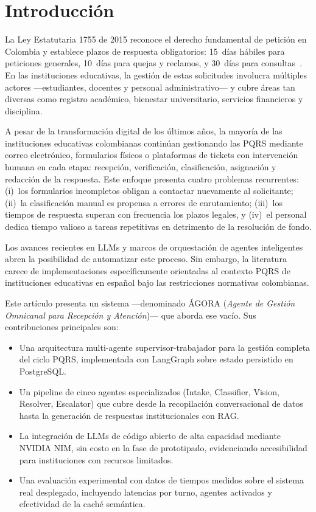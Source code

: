 \documentclass[runningheads]{llncs}
\begin{document}
\section{Introducción}
\label{sec:intro}

La Ley Estatutaria 1755 de 2015 reconoce el derecho fundamental de petición en Colombia y establece plazos de respuesta obligatorios: 15~días hábiles para peticiones generales, 10~días para quejas y reclamos, y 30~días para consultas~\cite{ley1755}. En las instituciones educativas, la gestión de estas solicitudes involucra múltiples actores —estudiantes, docentes y personal administrativo— y cubre áreas tan diversas como registro académico, bienestar universitario, servicios financieros y disciplina.

A pesar de la transformación digital de los últimos años, la mayoría de las instituciones educativas colombianas continúan gestionando las PQRS mediante correo electrónico, formularios físicos o plataformas de tickets con intervención humana en cada etapa: recepción, verificación, clasificación, asignación y redacción de la respuesta. Este enfoque presenta cuatro problemas recurrentes: (i)~los formularios incompletos obligan a contactar nuevamente al solicitante; (ii)~la clasificación manual es propensa a errores de enrutamiento; (iii)~los tiempos de respuesta superan con frecuencia los plazos legales, y (iv)~el personal dedica tiempo valioso a tareas repetitivas en detrimento de la resolución de fondo.

Los avances recientes en LLMs y marcos de orquestación de agentes inteligentes ~\cite{brown2020,park2023,wang2024} abren la posibilidad de automatizar este proceso. Sin embargo, la literatura carece de implementaciones específicamente orientadas al contexto PQRS de instituciones educativas en español bajo las restricciones normativas colombianas.

Este artículo presenta un sistema —denominado ÁGORA (\textit{Agente de Gestión Omnicanal para Recepción y Atención})— que aborda ese vacío. Sus contribuciones principales son:
\begin{itemize}[noitemsep]
  \item Una arquitectura multi-agente supervisor-trabajador para la gestión completa del ciclo PQRS, implementada con LangGraph sobre estado persistido en PostgreSQL.
  \item Un pipeline de cinco agentes especializados (Intake, Classifier, Vision, Resolver, Escalator) que cubre desde la recopilación conversacional de datos hasta la generación de respuestas institucionales con RAG.
  \item La integración de LLMs de código abierto de alta capacidad mediante NVIDIA NIM, sin costo en la fase de prototipado, evidenciando accesibilidad para instituciones con recursos limitados.
  \item Una evaluación experimental con datos de tiempos medidos sobre el sistema real desplegado, incluyendo latencias por turno, agentes activados y efectividad de la caché semántica.
\end{itemize}
\end{document}

